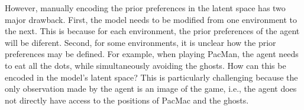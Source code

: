 \documentclass[twoside,11pt]{article}
\begin{document}
However, manually encoding the prior preferences in the latent space has two major drawback. First, the model needs to be modified from one environment to the next. This is because for each environment, the prior preferences of the agent will be diferent. Second, for some environments, it is unclear how the prior preferences may be defined. For example, when playing PacMan, the agent needs to eat all the dots, while simultaneously avoiding the ghosts. How can this be encoded in the model's latent space? This is particularly challenging because the only observation made by the agent is an image of the game, i.e., the agent does not directly have access to the positions of PacMac and the ghosts. 


\begin{figure}[H]
	\begin{center}
\end{center}
\end{figure}
\end{document}
